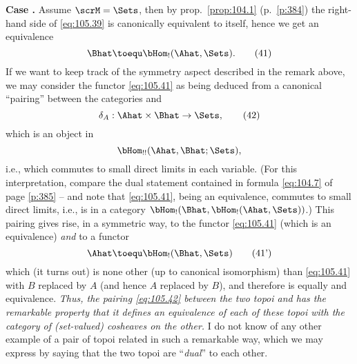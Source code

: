 \textbf{Case .}%
\enspace Assume $\scrM=\Sets$,
then by prop.\ \ref{prop:104.1} (p.\ \ref{p:384}) the right-hand side
of \eqref{eq:105.39} is canonically equivalent to \Bhat{} itself,
hence we get an equivalence
\begin{equation}
  \label{eq:105.41}
  \Bhat \toequ \bHom_!(\Ahat,\Sets).\tag{41}
\end{equation}
If we want to keep track of the symmetry aspect described in the
remark above, we may consider the functor \eqref{eq:105.41} as being
deduced from a canonical ``pairing'' between the categories \Ahat{}
and \Bhat
\begin{equation}
  \label{eq:105.42}
  \delta_A : \Ahat\times\Bhat\to\Sets,\tag{42}
\end{equation}
which is an object in
\[\bHom_{!!}(\Ahat,\Bhat; \Sets),\]
i.e., which commutes to small direct limits in each variable. (For
this interpretation, compare the dual statement contained in formula
\eqref{eq:104.7} of page \ref{p:385} -- and note that
\eqref{eq:105.41}, being an equivalence, commutes to small direct
limits, i.e., is in a category $\bHom_!(\Bhat, \bHom_!(\Ahat,\Sets))$.)
This pairing gives rise, in a symmetric way, to the
functor \eqref{eq:105.41} (which is an equivalence) \emph{and} to a
functor
\begin{equation}
  \label{eq:105.41prime}
  \Ahat\toequ \bHom_!(\Bhat,\Sets)\tag{41'}
\end{equation}
which (it turns out) is none other (up to canonical isomorphism) than
\eqref{eq:105.41} with $B$ replaced by $A$ (and hence $A$ replaced by
$B$), and therefore is equally and equivalence. \emph{Thus, the
  pairing \eqref{eq:105.42} between the two topoi \Ahat{} and \Bhat{}
  has the remarkable property that it defines an equivalence of each
  of these topoi with the category of \textup(set-valued\textup)
  cosheaves on the other.} I do not know of any other example of a
pair of topoi related in such a remarkable way, which we may express
by saying that the two topoi are ``\emph{dual}'' to each other.


